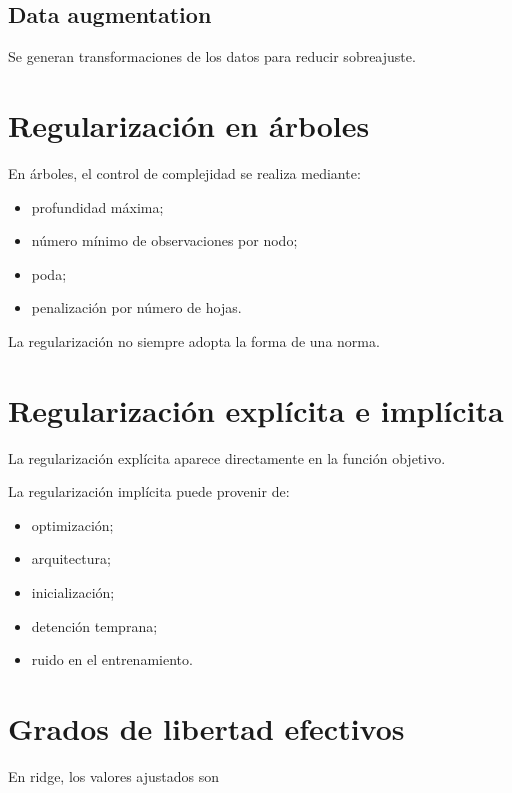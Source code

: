 \documentclass[
  spanish,
  11pt,
  letterpaper,
  DIV=11,
  numbers=noendperiod]{scrreprt}
\providecommand{\tightlist}{%
  \setlength{\itemsep}{0pt}\setlength{\parskip}{0pt}}
\theoremstyle{definition}
\theoremstyle{plain}
\theoremstyle{definition}
\theoremstyle{remark}
\begin{document}
\subsection{Data augmentation}\label{data-augmentation}

Se generan transformaciones de los datos para reducir sobreajuste.

\section{Regularización en
árboles}\label{regularizaciuxf3n-en-uxe1rboles}

En árboles, el control de complejidad se realiza mediante:

\begin{itemize}
\tightlist
\item
  profundidad máxima;
\item
  número mínimo de observaciones por nodo;
\item
  poda;
\item
  penalización por número de hojas.
\end{itemize}

La regularización no siempre adopta la forma de una norma.

\section{Regularización explícita e
implícita}\label{regularizaciuxf3n-expluxedcita-e-impluxedcita}

La regularización explícita aparece directamente en la función objetivo.

La regularización implícita puede provenir de:

\begin{itemize}
\tightlist
\item
  optimización;
\item
  arquitectura;
\item
  inicialización;
\item
  detención temprana;
\item
  ruido en el entrenamiento.
\end{itemize}

\section{Grados de libertad
efectivos}\label{grados-de-libertad-efectivos}

En ridge, los valores ajustados son
\end{document}
